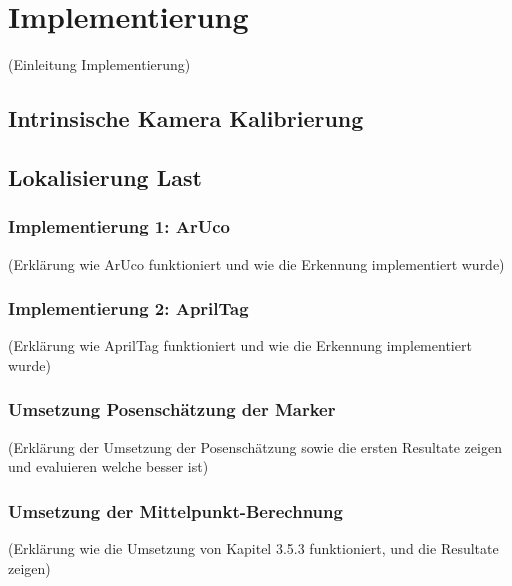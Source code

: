 \section{Implementierung}
(Einleitung Implementierung)


\subsection{Intrinsische Kamera Kalibrierung}


\subsection{Lokalisierung Last}


\subsubsection{Implementierung 1: ArUco}
(Erklärung wie ArUco funktioniert und wie die Erkennung implementiert wurde)

\subsubsection{Implementierung 2: AprilTag}
(Erklärung wie AprilTag funktioniert und wie die Erkennung implementiert wurde)

\subsubsection{Umsetzung Posenschätzung der Marker}
(Erklärung der Umsetzung der Posenschätzung sowie die ersten Resultate zeigen und evaluieren welche besser ist)

\subsubsection{Umsetzung der Mittelpunkt-Berechnung}
(Erklärung wie die Umsetzung von Kapitel 3.5.3 funktioniert, und die Resultate zeigen) 




